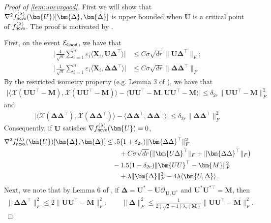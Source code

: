 \documentclass[10pt]{article}
\newcommand{\eps}{\ensuremath{\varepsilon}}
\newcommand{\s}{^*}
\renewcommand{\t}{^{\top}}
\theoremstyle{definition}
\begin{document}
\begin{proof}[Proof of \cref{lem:uncvxgood}]
First we will show that $\nabla^2 f^{(\lambda)}_{{\sf ncvx}}(\bm{U})[ \bm{\Delta}, \bm{\Delta}]$ is upper bounded when $\bm{U}$ is a critical point of $f^{(\lambda)}_{{\sf ncvx}}$.  The proof is motivated by \citet{ge_no_2017}.

First, on the event $\mathcal{E}_{{\sf Good}}$, we have that
\begin{align}
\bigg|    \frac{4}{\sqrt{n}} \sum_{i=1}^{n} \eps_i \langle \bm{X}_i, \bm{U\Delta}\t \rangle \bigg| &\leq C \sigma \sqrt{dr} \| \bm{U\Delta}\t \|_F; \\
\bigg| \frac{1}{\sqrt{n}} \sum_{i=1}^{n} \eps_i \langle \bm{X}_i, \bm{\Delta \Delta}\t \rangle \bigg| &\leq C \sigma \sqrt{dr} \| \bm{\Delta\Delta}\t \|_F
\end{align}
By the restricted isometry property (e.g. Lemma 3 of \citet{chi_nonconvex_2019}), we have that
\begin{align}
    \bigg| \big\langle \mathcal{X}(\bm{UU}\t - \bm{M}), \mathcal{X}(\bm{UU}\t - \bm{M}) \big \rangle - \langle \bm{UU}\t - \bm{M},  \bm{UU}\t - \bm{M}\rangle \bigg| \leq \delta_{2r} \| \bm{UU}\t - \bm{M} \|_F^2
\end{align}
and
\begin{align}
    \bigg| \langle \mathcal{X}( \bm{\Delta \Delta}\t  ) ,  \mathcal{X}( \bm{\Delta \Delta}\t) \rangle - \langle \bm{\Delta \Delta}\t, \bm{\Delta \Delta}\t \rangle \bigg| \leq \delta_{2r}  \| \bm{\Delta \Delta}\t \|_F^2
\end{align}
Consequently, if $\bm{U}$ satisfies $\nabla f^{(\lambda)}_{{\sf ncvx}}(\bm{U}) = 0$, 
    \begin{align}
     \nabla^2 f^{(\lambda)}_{{\sf ncvx}}(\bm{U})[ \bm{\Delta},\bm{\Delta}] & \leq .5\big( 1 + \delta_{2r}) \| \bm{\Delta \Delta}\t \|_F^2 \\
     &\qquad + C \sigma \sqrt{dr} \big( \| \bm{U\Delta}\t \|_F + \| \bm{\Delta\Delta}\t \|_F \big) \\
     &\quad - 1.5( 1 - \delta_{2r}) \| \bm{UU}\t - \bm{M} \|_F^2 \\
     &\qquad + \lambda \| \bm{\Delta}\|_F^2 - 4 \lambda \langle \bm{U,\Delta} \rangle.
     \end{align}
     Next, we note that by Lemma 6 of \citet{ge_no_2017}, if $\bm{\Delta} = \bm{U}\s - \bm{U}\mathcal{O}_{\bm{U},\bm{U}\s}$  and $\bm{U}\s \bm{U}^{*\top} = \bm{M}$, then 
     \begin{align}
         \| \bm{\Delta\Delta}\t \|_F^2 \leq 2 \| \bm{UU}\t - \bm{M} \|_F^2; \qquad \| \bm{\Delta}\|_F^2 \leq \frac{1}{2(\sqrt{2} - 1) \lambda_r(\bm{M})} \| \bm{UU}\t - \bm{M} \|_F^2.

\end{align}
\end{proof}
\end{document}
